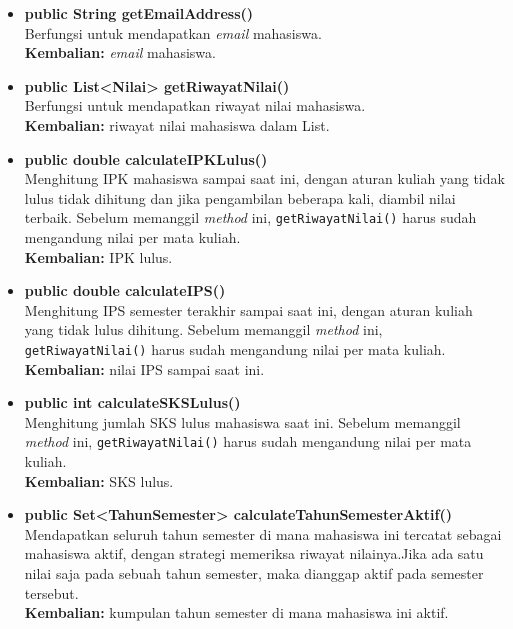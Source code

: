 \begin{enumerate}
\begin{enumerate}
\begin{itemize}
			\item \textbf{public String getEmailAddress()}\\
				Berfungsi untuk mendapatkan \textit{email} mahasiswa.\\
				\textbf{Kembalian:} \textit{email} mahasiswa.
			
			\item \textbf{public List<Nilai> getRiwayatNilai()}\\
				Berfungsi untuk mendapatkan riwayat nilai mahasiswa.\\
				\textbf{Kembalian:} riwayat nilai mahasiswa dalam List.
				
			\item \textbf{public double calculateIPKLulus()}\\
				Menghitung IPK mahasiswa sampai saat ini, dengan aturan kuliah yang tidak lulus tidak dihitung dan jika pengambilan beberapa kali, diambil nilai terbaik. Sebelum memanggil \textit{method} ini, \texttt{getRiwayatNilai()} harus sudah mengandung nilai per mata kuliah.\\
				\textbf{Kembalian:} IPK lulus.
				
			\item \textbf{public double calculateIPS()}\\
				Menghitung IPS semester terakhir sampai saat ini, dengan aturan kuliah yang tidak lulus dihitung. Sebelum memanggil \textit{method} ini, \texttt{getRiwayatNilai()} harus sudah mengandung nilai per mata kuliah.\\
				\textbf{Kembalian:}  nilai IPS sampai saat ini.
				
			\item \textbf{public int calculateSKSLulus()}\\
				Menghitung jumlah SKS lulus mahasiswa saat ini. Sebelum memanggil \textit{method} ini, \texttt{getRiwayatNilai()} harus sudah mengandung nilai per mata kuliah.\\
				\textbf{Kembalian:} SKS lulus.
				
			\item \textbf{public Set<TahunSemester> calculateTahunSemesterAktif()}\\
				Mendapatkan seluruh tahun semester di mana mahasiswa ini tercatat sebagai mahasiswa aktif, dengan strategi memeriksa riwayat nilainya.Jika ada satu nilai saja pada sebuah tahun semester, maka dianggap aktif pada semester tersebut.\\
				\textbf{Kembalian:} kumpulan tahun semester di mana mahasiswa ini aktif.
				

\end{itemize}
\end{enumerate}
\end{enumerate}
